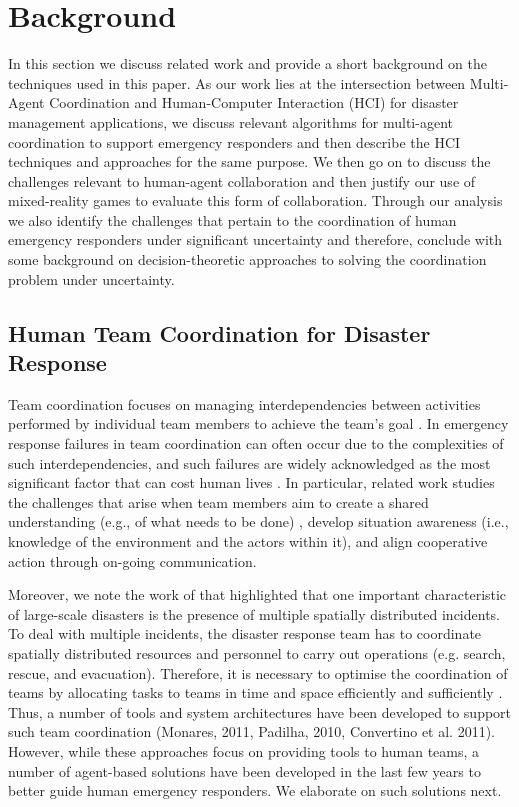 \section{Background}
In this section we discuss related work and provide a short background on the techniques used in this paper.  As our work lies at the intersection between Multi-Agent Coordination and Human-Computer Interaction (HCI) for disaster management applications, we discuss relevant algorithms for multi-agent coordination to support emergency responders and then describe the HCI techniques and approaches for the same purpose. We then go on to discuss the challenges relevant to human-agent collaboration and then justify our use of mixed-reality games to evaluate this form of collaboration.  Through our analysis we also identify the challenges that pertain to the coordination of human emergency responders under significant uncertainty and therefore, conclude with some background on decision-theoretic approaches to solving the coordination problem under uncertainty.



\subsection{Human Team Coordination for Disaster Response}
Team coordination focuses on managing interdependencies between activities performed  by individual team members to achieve the team's goal \cite[p. 361]{Malone:1990}. In emergency response failures in team coordination can often occur due to the complexities of such interdependencies, and such failures are widely acknowledged as the most significant factor that can cost human lives \cite[p. 2]{Toups et al., 2011}. In particular, related work studies the challenges that arise when team members aim to create a shared understanding (e.g., of what needs to be done) \citep{Convertino2010}, develop situation awareness (i.e., knowledge of the environment and the actors within it), and align cooperative action through on-going communication.  

Moreover, we note the work of \cite{chen:Etal:2005} that highlighted that one important characteristic of large-scale disasters is the presence of multiple spatially distributed incidents. To deal with multiple incidents, the disaster response team has to coordinate spatially distributed resources and personnel to carry out operations (e.g. search, rescue, and evacuation). Therefore, it is necessary to optimise the coordination of teams by allocating tasks to teams in time and space efficiently and sufficiently \cite{Nourjou et al 2011}. Thus, a number of tools and system architectures have been developed to support such team coordination (Monares, 2011, Padilha, 2010, Convertino et al. 2011). However, while these approaches focus on providing tools to human teams, a number of agent-based solutions have been developed in the last few years to better guide human emergency responders. We elaborate on such solutions next.
\

